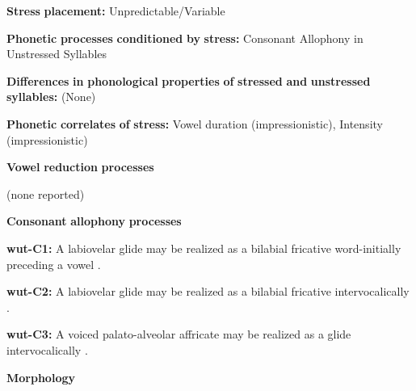 \begin{styleBody}
\textbf{Stress} \textbf{placement:} Unpredictable/Variable
\end{styleBody}

\begin{styleBody}
\textbf{Phonetic} \textbf{processes} \textbf{conditioned} \textbf{by} \textbf{stress:} Consonant Allophony in Unstressed Syllables
\end{styleBody}

\begin{styleBody}
\textbf{Differences} \textbf{in} \textbf{phonological} \textbf{properties} \textbf{of} \textbf{stressed} \textbf{and} \textbf{unstressed} \textbf{syllables:} (None)
\end{styleBody}

\begin{styleBody}
\textbf{Phonetic} \textbf{correlates} \textbf{of} \textbf{stress:} Vowel duration (impressionistic), Intensity (impressionistic)
\end{styleBody}

\begin{styleBody}
\textbf{Vowel} \textbf{reduction} \textbf{processes}
\end{styleBody}

\begin{styleBody}
(none reported)
\end{styleBody}

\begin{styleBody}
\textbf{Consonant} \textbf{allophony} \textbf{processes}
\end{styleBody}

\begin{styleBody}
\textbf{wut-C1:} A labiovelar glide may be realized as a bilabial fricative word-initially preceding a vowel \citep[57-8]{Marmion2010}.
\end{styleBody}

\begin{styleBody}
\textbf{wut-C2:} A labiovelar glide may be realized as a bilabial fricative intervocalically \citep[57-8]{Marmion2010}.
\end{styleBody}

\begin{styleBody}
\textbf{wut-C3:} A voiced palato-alveolar affricate may be realized as a glide intervocalically \citep[55]{Marmion2010}.
\end{styleBody}

\begin{styleBody}
\textbf{Morphology}
\end{styleBody}

